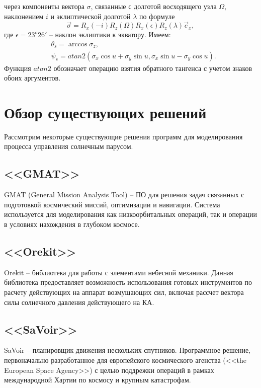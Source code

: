 через компоненты вектора $\sigma$, связанные с долготой восходящего узла $\Omega$,
наклонением $i$ и эклиптической долготой $\lambda$ по формуле
\begin{equation}
  \vec{\sigma} = R_x(-i)R_z(\Omega)R_x(\epsilon)R_z(\lambda)\vec{e}_x,
\end{equation}
где $\epsilon = 23^o26'$ -- наклон эклиптики к экватору. Имеем:
\begin{equation}
  \begin{aligned}
    & \theta_s = \arccos\sigma_z, \\
    & \psi_s = atan2(\sigma_x\cos u + \sigma_y\sin u, \sigma_x\sin u - \sigma_y\cos u).
  \end{aligned}
\end{equation}
Функция $atan2$ обозначает операцию взятия обратного тангенса с учетом знаков
обоих аргументов.
\section{Обзор существующих решений}
\noindent\indent Рассмотрим некоторые существующие решения программ для моделирования
процесса управления солнечным парусом.
\subsection{<<GMAT>>}
\noindent\indent GMAT (General Mission Analysis Tool) -- ПО для решения задач связанных
с подготовкой космический миссий, оптимизации и навигации. Система используется для
моделирования как низкоорбитальных операций, так и операции в условиях нахождения
в глубоком космосе.
\subsection{<<Orekit>>}
\noindent\indent Orekit -- библиотека для работы с элементами небесной механики.
Данная библиотека предоставляет возможность использования готовых инструментов по расчету
действующих на аппарат возмущающих сил, включая рассчет вектора силы солнечного давления
действующего на КА.
\subsection{<<SaVoir>>}
\noindent\indent SaVoir -- планировщик движения нескольких спутников. Программное
решение, первоначально разработанное для европейского космического агенства
(<<the European Space Agency>>) с целью поддрежки операций в рамках международной
Хартии по космосу и крупным катастрофам.
